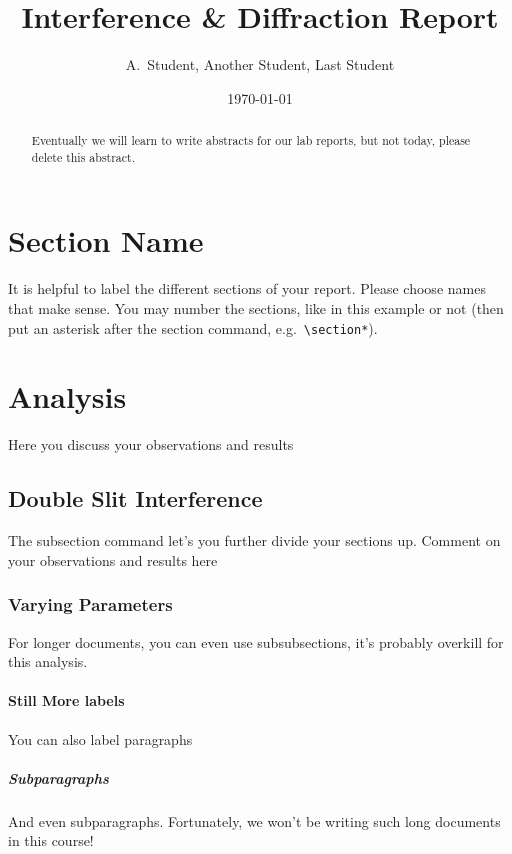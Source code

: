 \documentclass[12pt]{article}
\begin{document}
\title{Interference \& Diffraction Report}
\author{A.~Student, Another Student, Last Student}
\date{\today}

\maketitle

\begin{abstract}
	Eventually we will learn to write abstracts for our lab reports, but not today, please delete this abstract.
\end{abstract}

\section{Section Name}
	It is helpful to label the different sections of your report.
    Please choose names that make sense.  You may number the sections, like in this example or not (then put an asterisk after the section command, e.g.~\verb+\section*+). 
    
    
\section{Analysis}
	Here you discuss your observations and results
	
    \subsection{Double Slit Interference}
		The subsection command let's you further divide your sections up.  Comment on your observations and results here
        
        \subsubsection{Varying Parameters}
        	For longer documents, you can even use subsubsections, 
            it's probably overkill for this analysis.
            
            \paragraph{Still More labels}
            	You can also label paragraphs
                
                \subparagraph{Subparagraphs}
                	And even subparagraphs.  Fortunately, we won't be 
                    writing such long documents in this course!
       
\end{document}
